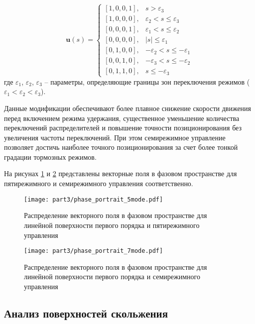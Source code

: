 \begin{equation}\label{eq:control_law_7_mode}
	\mathbf{u}(s) = \begin{cases}
		[1,0,0,1], & s > \varepsilon_3                      \\
		[1,0,0,0], & \varepsilon_2 < s \leq \varepsilon_3   \\
		[0,0,0,1], & \varepsilon_1 < s \leq \varepsilon_2   \\
		[0,0,0,0], & |s| \leq \varepsilon_1                 \\
		[0,1,0,0], & -\varepsilon_2 < s \leq -\varepsilon_1 \\
		[0,0,1,0], & -\varepsilon_3 < s \leq -\varepsilon_2 \\
		[0,1,1,0], & s \leq -\varepsilon_3
	\end{cases}
\end{equation}
где $\varepsilon_1$, $\varepsilon_2$, $\varepsilon_3$ -- параметры, определяющие границы зон переключения режимов ($\varepsilon_1 < \varepsilon_2 < \varepsilon_3$).

Данные модификации обеспечивают более плавное снижение скорости движения перед включением режима удержания,
существенное уменьшение количества переключений распределителей и повышение точности позиционирования
без увеличения частоты переключений. При этом семирежимное управление позволяет достичь
наиболее точного позиционирования за счет более тонкой градации тормозных режимов.

На рисунах \ref{fig:vector_field_linear_5mode} и \ref{fig:vector_field_linear_7mode} представлены векторные поля
в фазовом пространстве для пятирежимного и семирежимного управления соответственно.

\begin{figure}[htbp]
	\centering
	\texttt{[image: part3/phase\_portrait\_5mode.pdf]}
	\caption{Распределение векторного поля в фазовом пространстве для линейной поверхности первого порядка и пятирежимного управления}
	\label{fig:vector_field_linear_5mode}
\end{figure}

\begin{figure}[htbp]
	\centering
	\texttt{[image: part3/phase\_portrait\_7mode.pdf]}
	\caption{Распределение векторного поля в фазовом пространстве для линейной поверхности первого порядка и семирежимного управления}
	\label{fig:vector_field_linear_7mode}
\end{figure}

\subsection{Анализ поверхностей скольжения}\label{subsec:ch3/sec3/sub3}


